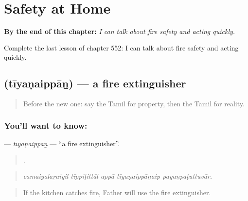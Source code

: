 
\chapter{Safety at Home}
\label{ch:ta-safety-at-home}

\begin{chapteropening}
\textbf{By the end of this chapter:} \emph{I can talk about fire safety and acting quickly.}

Complete the last lesson of chapter 552: I can talk about fire safety and acting quickly.
\end{chapteropening}

\section[\texorpdfstring{\ta{தீயணைப்பான்} (tīyaṇaippāṉ)}{தீயணைப்பான் (tīyaṇaippāṉ)}]{ (tīyaṇaippāṉ) — a fire extinguisher}

\label{lesson:TA-C552-tiyanaippan}



\begin{quote}
Before the new one: say the Tamil for property, then the Tamil for reality.
\end{quote}

\subsection*{You'll want to know: }
\textbf{} — \emph{tīyaṇaippāṉ} — \textquotedblleft{}a fire extinguisher\textquotedblright{}.

\begin{quote}
    .
\end{quote}

\begin{quote}
\emph{camaiyalaṟaiyil tīppiṭittāl appā tīyaṇaippāṉaip payaṉpaṭuttuvār.}
\end{quote}

\begin{quote}
If the kitchen catches fire, Father will use the fire extinguisher.
\end{quote}

